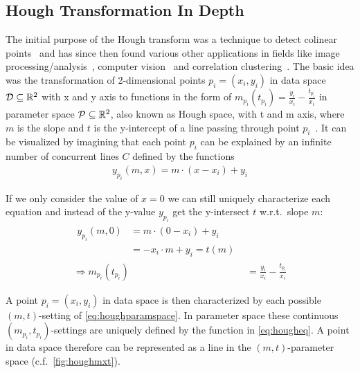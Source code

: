 
\subsection{Hough Transformation In Depth}\label{ssec:houghindepth}
The initial purpose of the Hough transform was a technique to detect colinear points~\cite{houghOriginal1962method} and has since then found various other applications in fields like image processing/analysis~\cite{rosenfeld1969picture,ballard1981generalizing}, computer vision~\cite{davies2004machine} and correlation clustering~\cite{CASHachtert2008robust}.
The basic idea was the transformation of 2-dimensional points $p_i = (x_i,y_i)$ in data space $\mathcal{D} \subseteq \mathbb{R}^2$ with x and y axis to functions in the form of ${m_{p_i}(t_{p_i}) = \frac{y_i}{x_i} - \frac{t_{p_i}}{x_i}}$ in parameter space $\mathcal{P} \subseteq \mathbb{R}^2$, also known as Hough space, with t and m axis, where $m$ is the slope and $t$ is the y-intercept of a line passing through point $p_i$~\cite{illingworth1988survey}. It can be visualized by imagining that each point $p_i$ can be explained by an infinite number of concurrent lines $C$ defined by the functions 
\begin{align}
    {y_{p_i}(m,x) = m \cdot (x - x_i) + y_i}
\end{align}

If we only consider the value of $x=0$ we can still uniquely characterize each equation and instead of the y-value $y_{p_i}$ get the y-intersect $t$ w.r.t.\ slope $m$:
\begin{align}\label{eq:houghparamspace}
\begin{split}
y_{p_i}(m,0) 
&= m \cdot (0 - x_i) + y_i\\
&= -x_i \cdot m + y_i = t(m)
\end{split}\\
\label{eq:hougheq}
\Rightarrow m_{p_i}(t_{p_i}) &= \frac{y_i}{x_i} - \frac{t_{p_i}}{x_i}
\end{align}

A point $p_i = (x_i, y_i)$ in data space is then characterized by each possible $(m,t)$-setting of \autoref{eq:houghparamspace}. In parameter space these continuous $(m_{p_i},t_{p_i})$-settings are uniquely defined by the function in \autoref{eq:hougheq}. A point in data space therefore can be represented as a line in the $(m,t)$-parameter space (c.f.\ \autoref{fig:houghmxt}).  %

